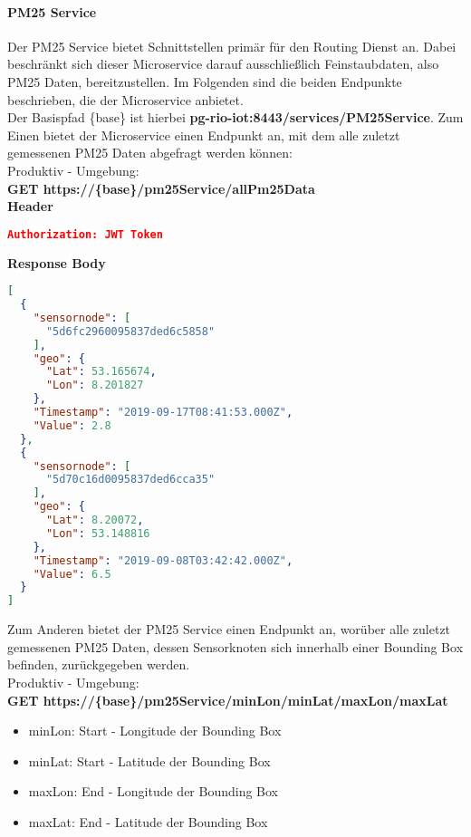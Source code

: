 \paragraph{PM25 Service}
Der PM25 Service bietet Schnittstellen primär für den Routing Dienst an.
Dabei beschränkt sich dieser Microservice darauf ausschließlich Feinstaubdaten, also PM25 Daten, bereitzustellen.
Im Folgenden sind die beiden Endpunkte beschrieben, die der Microservice anbietet.
\\
Der Basispfad \{base\} ist hierbei \textbf{pg-rio-iot:8443/services/PM25Service}.
\newline
Zum Einen bietet der Microservice einen Endpunkt an, mit dem alle zuletzt gemessenen PM25 Daten abgefragt werden können:
\newline
\\
Produktiv - Umgebung:
\\
\textbf{GET https://\{base\}/pm25Service/allPm25Data}
\\
\textbf{Header}
\begin{lstlisting}[language=json,firstnumber=1,basicstyle=\footnotesize]
Authorization: JWT Token
\end{lstlisting}
\textbf{Response Body}
\begin{lstlisting}[language=json,firstnumber=1,basicstyle=\footnotesize]
[
  {
    "sensornode": [
      "5d6fc2960095837ded6c5858"
    ],
    "geo": {
      "Lat": 53.165674,
      "Lon": 8.201827
    },
    "Timestamp": "2019-09-17T08:41:53.000Z",
    "Value": 2.8
  },
  {
    "sensornode": [
      "5d70c16d0095837ded6cca35"
    ],
    "geo": {
      "Lat": 8.20072,
      "Lon": 53.148816
    },
    "Timestamp": "2019-09-08T03:42:42.000Z",
    "Value": 6.5
  }
]
\end{lstlisting}
Zum Anderen bietet der PM25 Service einen Endpunkt an, worüber alle zuletzt gemessenen PM25 Daten, dessen Sensorknoten sich innerhalb einer Bounding Box befinden, zurückgegeben werden.
\\
Produktiv - Umgebung:
\\
\textbf{GET https://\{base\}/pm25Service/minLon/minLat/maxLon/maxLat}
\begin{itemize}
	\item minLon: Start - Longitude der Bounding Box
	\item minLat: Start - Latitude der Bounding Box
	\item maxLon: End - Longitude der Bounding Box
	\item maxLat: End - Latitude der Bounding Box
\end{itemize}
